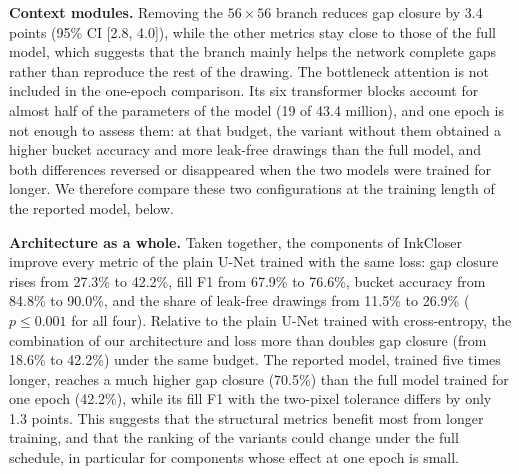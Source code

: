 \documentclass{IEEEcsmag}
\begin{document}
\textbf{Context modules.} Removing the $56\times 56$ branch reduces gap closure by
3.4 points (95\% CI [2.8, 4.0]), while the other metrics stay close to those of the
full model, which suggests that the branch mainly helps the network complete gaps
rather than reproduce the rest of the drawing. The bottleneck attention is not
included in the one-epoch comparison. Its six transformer blocks account for almost
half of the parameters of the model (19 of 43.4 million), and one epoch is not
enough to assess them: at that budget, the variant without them obtained a higher
bucket accuracy and more leak-free drawings than the full model, and both
differences reversed or disappeared when the two models were trained for longer. We
therefore compare these two configurations at the training length of the reported
model, below.

\textbf{Architecture as a whole.} Taken together, the components of InkCloser
improve every metric of the plain U-Net trained with the same loss: gap closure
rises from 27.3\% to 42.2\%, fill F1 from 67.9\% to 76.6\%, bucket accuracy from
84.8\% to 90.0\%, and the share of leak-free drawings from 11.5\% to 26.9\%
($p \le 0.001$ for all four). Relative to the plain U-Net trained with
cross-entropy, the combination of our architecture and loss more than doubles gap
closure (from 18.6\% to 42.2\%) under the same budget. The reported model, trained
five times longer, reaches a much higher gap closure (70.5\%) than the full model
trained for one epoch (42.2\%), while its fill F1 with the two-pixel tolerance
differs by only 1.3 points. This suggests that the structural metrics benefit most
from longer training, and that the ranking of the variants could change under the
full schedule, in particular for components whose effect at one epoch is small.
\end{document}
